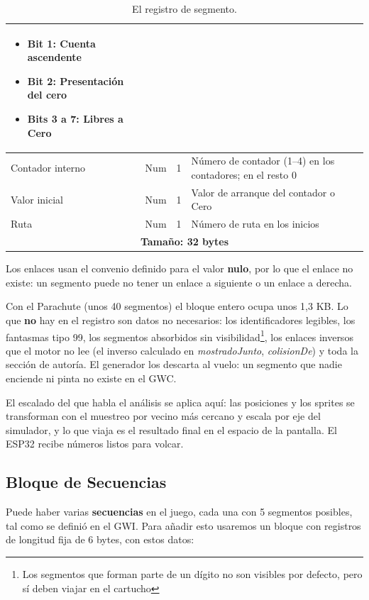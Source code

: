 \begin{table}[H]
\begin{tabular}{|l|c|c|p{8.4cm}|}
\begin{itemize}
			\item \textbf{Bit 1:} Cuenta ascendente
			\item \textbf{Bit 2:} Presentación del cero
			\item \textbf{Bits 3 a 7:} Libres a Cero
		\end{itemize} \\
		\hline
		Contador interno & Num & 1 & Número de contador (1--4) en los contadores; en el resto 0 \\
		\hline
		Valor inicial & Num & 1 & Valor de arranque del contador o Cero \\
		\hline
		Ruta & Num & 1 & Número de ruta en los inicios \\
		\hline
		\hline\hline
		\multicolumn{4}{|c|}{\textbf{Tamaño: 32 bytes}} \\
		\hline
	\end{tabular}
	\caption{El registro de segmento.}
\end{table}

Los enlaces usan el convenio definido para el valor \textbf{nulo}, por lo que el enlace no existe: un segmento puede no tener un enlace a siguiente o un enlace a derecha.

Con el Parachute (unos 40 segmentos) el bloque entero ocupa unos
1,3 KB. Lo que \textbf{no} hay en el registro son datos no necesarios: los identificadores legibles, los fantasmas tipo
99, los segmentos absorbidos sin visibilidad\footnote{Los segmentos que forman parte de un dígito no son visibles por defecto, pero sí deben viajar en el cartucho}, los enlaces inversos que el motor no lee
(el inverso calculado en \emph{mostradoJunto}, \emph{colisionDe}) y toda la sección de autoría. El generador los descarta al vuelo: un segmento que nadie
enciende ni pinta no existe en el GWC.

El escalado del que habla el análisis se aplica aquí: las
posiciones y los sprites se transforman con el muestreo por vecino
más cercano y escala por eje del simulador, y lo que viaja es el
resultado final en el espacio de la pantalla. El ESP32 recibe
números listos para volcar.

\subsection{Bloque de Secuencias}
\label{sec:A02GWCBlSecuencias}

Puede haber varias \textbf{secuencias} en el juego, cada una con 5 segmentos posibles, tal como se definió en el GWI. Para añadir esto usaremos un bloque con registros de longitud fija de 6 bytes, con estos datos:

